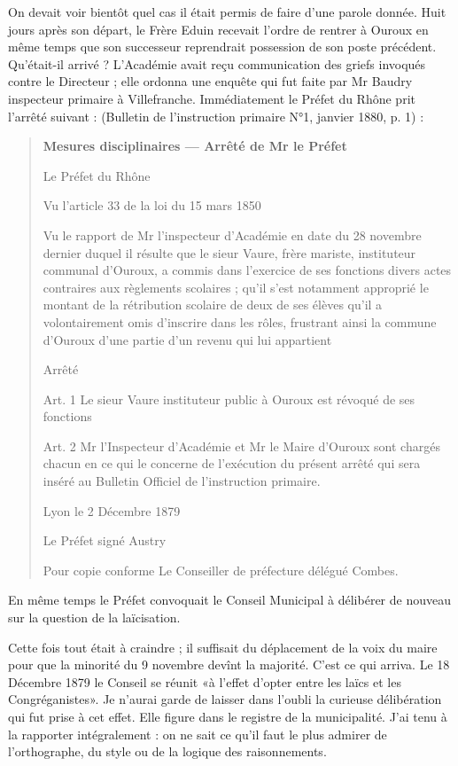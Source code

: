 On devait voir bientôt quel cas il était permis de faire d'une parole donnée. Huit jours après son départ, le Frère Eduin recevait l'ordre de rentrer à Ouroux en même temps que son successeur reprendrait possession de son poste précédent. Qu'était-il arrivé ? L'Académie avait reçu communication des griefs invoqués contre le Directeur ; elle ordonna une enquête qui fut faite par Mr Baudry inspecteur primaire à Villefranche. Immédiatement le Préfet du Rhône prit l'arrêté suivant : (Bulletin de l'instruction primaire N°1, janvier 1880, p. 1) :

\begin{quote}
\textbf{Mesures disciplinaires — Arrêté de Mr le Préfet}

Le Préfet du Rhône

Vu l'article 33 de la loi du 15 mars 1850

Vu le rapport de Mr l'inspecteur d'Académie en date du 28 novembre dernier duquel il résulte que le sieur Vaure, frère mariste, instituteur communal d'Ouroux, a commis dans l'exercice de ses fonctions divers actes contraires aux règlements scolaires ; qu'il s'est notamment approprié le montant de la rétribution scolaire de deux de ses élèves qu'il a volontairement omis d'inscrire dans les
rôles, frustrant ainsi la commune d'Ouroux d'une partie d'un revenu qui lui appartient

Arrêté

Art. 1 Le sieur Vaure instituteur public à Ouroux est révoqué de ses fonctions

Art. 2 Mr l'Inspecteur d'Académie et Mr le Maire d'Ouroux sont chargés chacun en ce qui le concerne de l'exécution du présent arrêté qui sera inséré au Bulletin Officiel de l'instruction primaire.

Lyon le 2 Décembre 1879

Le Préfet  
signé Austry

Pour copie conforme  
Le Conseiller de préfecture délégué  
Combes.
\end{quote}

En même temps le Préfet convoquait le Conseil Municipal à délibérer de nouveau sur la question de la laïcisation.

Cette fois tout était à craindre ; il suffisait du déplacement de la voix du maire pour que la minorité du 9 novembre devînt la majorité. C'est ce qui arriva. Le 18 Décembre 1879 le Conseil se réunit «à l'effet d'opter entre les laïcs et les Congréganistes». Je n'aurai garde de laisser dans l'oubli la curieuse délibération qui fut prise à cet effet. Elle figure dans le registre de la municipalité. J'ai tenu à la rapporter intégralement : on ne sait ce qu'il faut le plus admirer de l'orthographe, du style ou de la logique des raisonnements.

